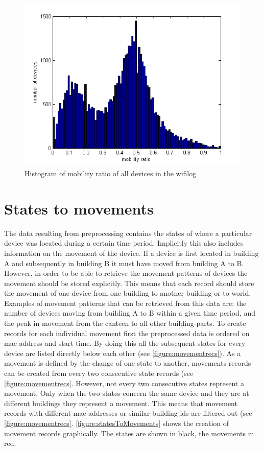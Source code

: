 \begin{figure}[H]
\centering
\includegraphics[scale=0.7]{mobility.png}
\captionsetup{justification=centering}
\caption{Histogram of mobility ratio of all devices in the wifilog}
\label{figure:mobility}
\end{figure}

\section{States to movements}\label{statesToMovements}
The data resulting from preprocessing contains the states of where a particular device was located during a certain time period. Implicitly this also includes information on the movement of the device. If a device is first located in building A and subsequently in building B it must have moved from building A to B. However, in order to be able to retrieve the movement patterns of devices the movement should be stored explicitly. This means that each record should store the movement of one device from one building to another building or to world. Examples of movement patterns that can be retrieved from this data are: the number of devices moving from building A to B within a given time period, and the peak in movement from the canteen to all other building-parts. 
To create records for each individual movement first the preprocessed data is ordered on mac address and start time. By doing this all the subsequent states for every device are listed directly below each other (see \autoref{figure:movementrecs}). As a movement is defined by the change of one state to another, movements records can be created from every two consecutive state records (see \autoref{figure:movementrecs}. However, not every two consecutive states represent a movement. Only when the two states concern the same device and they are at different buildings they represent a movement. This means that movement records with different mac addresses or similar building ids are filtered out (see \autoref{figure:movementrecs}. \autoref{figure:statesToMovements} shows the creation of movement records graphically. The states are shown in black, the movements in red.

